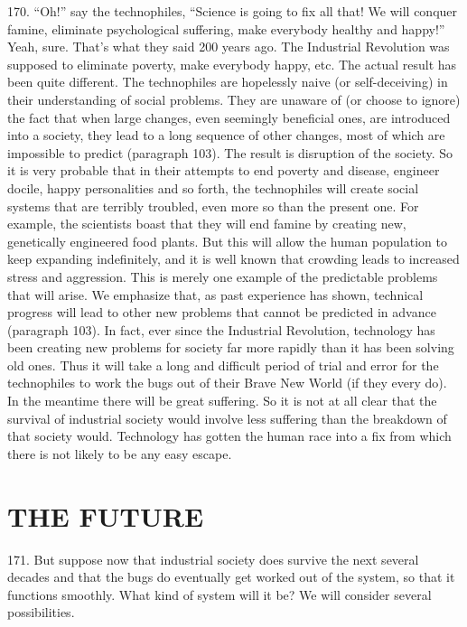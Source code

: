 \documentclass{article}
\begin{document}
170. “Oh!” say the technophiles, “Science is going to fix all that! We will conquer famine, 
eliminate psychological suffering, make everybody healthy and happy!” Yeah, sure. That’s what 
they said 200 years ago. The Industrial Revolution was supposed to eliminate poverty, make 
everybody happy, etc. The actual result has been quite different. The technophiles are hopelessly 
naive (or self-deceiving) in their understanding of social problems. They are unaware of (or 
choose to ignore) the fact that when large changes, even seemingly beneficial ones, are introduced 
into a society, they lead to a long sequence of other changes, most of which are impossible to 
predict (paragraph 103). The result is disruption of the society. So it is very probable that in their 
attempts to end poverty and disease, engineer docile, happy personalities and so forth, the 
technophiles will create social systems that are terribly troubled, even more so than the present 
one. For example, the scientists boast that they will end famine by creating new, genetically 
engineered food plants. But this will allow the human population to keep expanding indefinitely, 
and it is well known that crowding leads to increased stress and aggression. This is merely one 
example of the predictable problems that will arise. We emphasize that, as past experience has 
shown, technical progress will lead to other new problems that cannot be predicted in advance 
(paragraph 103). In fact, ever since the Industrial Revolution, technology has been creating new 
problems for society far more rapidly than it has been solving old ones. Thus it will take a long 
and difficult period of trial and error for the technophiles to work the bugs out of their Brave New 
World (if they every do). In the meantime there will be great suffering. So it is not at all clear that 
the survival of industrial society would involve less suffering than the breakdown of that society 
would. Technology has gotten the human race into a fix from which there is not likely to be any 
easy escape. 


\section{THE FUTURE}

\hspace{0.5cm} 171. But suppose now that industrial society does survive the next several decades and that the 
bugs do eventually get worked out of the system, so that it functions smoothly. What kind of 
system will it be? We will consider several possibilities. \vspace{\baselineskip}
\end{document}
